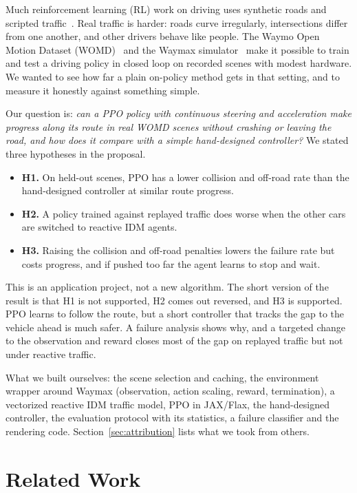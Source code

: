 \documentclass[conference]{IEEEtran}
\begin{document}
Much reinforcement learning (RL) work on driving uses synthetic roads and scripted
traffic~\cite{dosovitskiy2017carla,kiran2022survey}. Real traffic is harder: roads curve
irregularly, intersections differ from one another, and other drivers behave like people.
The Waymo Open Motion Dataset (WOMD)~\cite{ettinger2021womd} and the Waymax
simulator~\cite{gulino2023waymax} make it possible to train and test a driving policy in
closed loop on recorded scenes with modest hardware. We wanted to see how far a plain
on-policy method gets in that setting, and to measure it honestly against something
simple.

Our question is: \emph{can a PPO policy with continuous steering and acceleration make
progress along its route in real WOMD scenes without crashing or leaving the road, and
how does it compare with a simple hand-designed controller?} We stated three hypotheses
in the proposal.
\begin{itemize}
\item \textbf{H1.} On held-out scenes, PPO has a lower collision and off-road rate than
the hand-designed controller at similar route progress.
\item \textbf{H2.} A policy trained against replayed traffic does worse when the other
cars are switched to reactive IDM agents.
\item \textbf{H3.} Raising the collision and off-road penalties lowers the failure rate
but costs progress, and if pushed too far the agent learns to stop and wait.
\end{itemize}

This is an application project, not a new algorithm. The short version of the result is
that H1 is not supported, H2 comes out reversed, and H3 is supported. PPO learns to
follow the route, but a short controller that tracks the gap to the vehicle ahead is
much safer. A failure analysis shows why, and a targeted change to the observation and
reward closes most of the gap on replayed traffic but not under reactive traffic.

What we built ourselves: the scene selection and caching, the environment wrapper around
Waymax (observation, action scaling, reward, termination), a vectorized reactive IDM
traffic model, PPO in JAX/Flax, the hand-designed controller, the evaluation protocol with
its statistics, a failure classifier and the rendering code. Section~\ref{sec:attribution}
lists what we took from others.

\section{Related Work}
\end{document}
